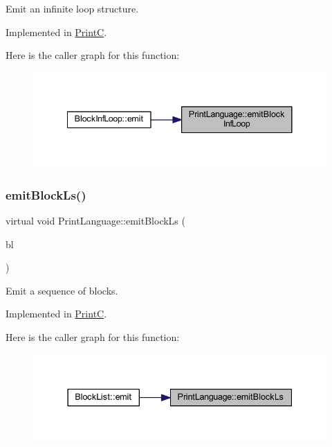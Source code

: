 Emit an infinite loop structure. 



Implemented in \mbox{\hyperlink{class_print_c_a895370c4d12dff0e264bef9ad63fe926}{PrintC}}.

Here is the caller graph for this function\+:
\nopagebreak
\begin{figure}[H]
\begin{center}
\leavevmode
\includegraphics[width=341pt]{class_print_language_a2d573f9f0fc1714e084829228f35580b_icgraph}
\end{center}
\end{figure}
\mbox{\label{class_print_language_a91b60be4c3dac2b8cc2f36467493d8e6}} 
\subsubsection{\texorpdfstring{emitBlockLs()}{emitBlockLs()}}
{\footnotesize\ttfamily virtual void Print\+Language\+::emit\+Block\+Ls (\begin{DoxyParamCaption}\item[{const \mbox{\hyperlink{class_block_list}{Block\+List}} $\ast$}]{bl }\end{DoxyParamCaption})\hspace{0.3cm}{\ttfamily [pure virtual]}}



Emit a sequence of blocks. 



Implemented in \mbox{\hyperlink{class_print_c_a0481482a247761069d030f40242e667a}{PrintC}}.

Here is the caller graph for this function\+:
\nopagebreak
\begin{figure}[H]
\begin{center}
\leavevmode
\includegraphics[width=337pt]{class_print_language_a91b60be4c3dac2b8cc2f36467493d8e6_icgraph}
\end{center}
\end{figure}
\mbox{\label{class_print_language_afac6d491a5ca9e72580c74bbf87a0968}} 
